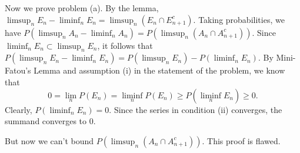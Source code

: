 \documentclass[letterpaper,10pt]{article}
\begin{document}
\begin{enumerate}
Now we prove problem (a). By the lemma, $\limsup_n E_n - \liminf_n E_n = \limsup_n (E_n \cap E_{n+1}^c)$. 
Taking probabilities, we have $P(\limsup_n A_n - \liminf_n A_n) = P(\limsup_n (A_n \cap A_{n+1}^c))$. 
Since $\liminf_n E_n \subset \limsup_n E_n$, it follows that $P(\limsup_n E_n - \liminf_n E_n) = P(\limsup_n E_n) - P(\liminf_n E_n)$.
By Mini-Fatou's Lemma and assumption (i) in the statement of the problem, we know that
\[
0 = \lim_n P(E_n) = \liminf_n P(E_n) \geq P(\liminf_n E_n) \geq 0\text{.}
\]
Clearly, $P(\liminf_n E_n) = 0$. Since the series in condition (ii) converges, the summand converges to $0$. 

But now we can't bound $P(\limsup_n (A_n \cap A_{n+1}^c))$. This proof is flawed.

\end{enumerate}
\end{document}

